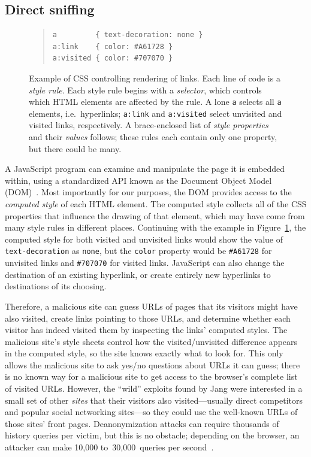 \documentclass[conference]{IEEEtran}
\begin{document}
\subsection{Direct sniffing}\label{sec:directsniff}

\begin{figure}
\begin{quote}\footnotesize
\begin{verbatim}
a         { text-decoration: none }
a:link    { color: #A61728 }
a:visited { color: #707070 }
\end{verbatim}
\end{quote}
\caption{Example of CSS controlling rendering of links. Each line of
  code is a \textit{style rule}. Each style rule begins with a
  \textit{selector}, which controls which HTML elements are affected
  by the rule. A lone \texttt{a} selects all \texttt{a} elements,
  i.e.\ hyperlinks; \texttt{a:link} and \texttt{a:visited} select
  unvisited and visited links, respectively.  A brace-enclosed list of
  \textit{style properties} and their \textit{values} follows; these
  rules each contain only one property, but there could be
  many.}\label{fig:css-example}
\end{figure}

A JavaScript program can examine and manipulate the page it is
embedded within, using a standardized API known as the Document Object
Model (DOM)~\cite{wwwdom}.  Most importantly for our purposes, the DOM
provides access to the \emph{computed style} of each HTML element.
The computed style collects all of the CSS properties that influence
the drawing of that element, which may have come from many style rules
in different places.  Continuing with the example in
Figure~\ref{fig:css-example}, the computed style for both visited and
unvisited links would show the value of \verb|text-decoration| as
\verb|none|, but the \verb|color| property would be \verb|#A61728| for
unvisited links and \verb|#707070| for visited links.  JavaScript can
also change the destination of an existing hyperlink, or create
entirely new hyperlinks to destinations of its choosing.

Therefore, a malicious site can guess URLs of pages that its visitors
might have also visited, create links pointing to those URLs, and
determine whether each visitor has indeed visited them by inspecting
the links' computed styles.  The malicious site's style sheets control
how the visited/unvisited difference appears in the computed style, so
the site knows exactly what to look for.  This only allows the
malicious site to ask yes/no questions about URLs it can guess; there
is no known way for a malicious site to get access to the browser's
complete list of visited URLs.  However, the “wild” exploits found by
Jang were interested in a small set of other \emph{sites} that their
visitors also visited---usually direct competitors and popular social
networking sites---so they could use the well-known URLs of those
sites' front pages.  Deanonymization attacks \cite{wondracek10deanon}
can require thousands of history queries per victim, but this is no
obstacle; depending on the browser, an attacker can make 10,000
to~30,000~queries per second~\cite{janc10wtikay}.
\end{document}
